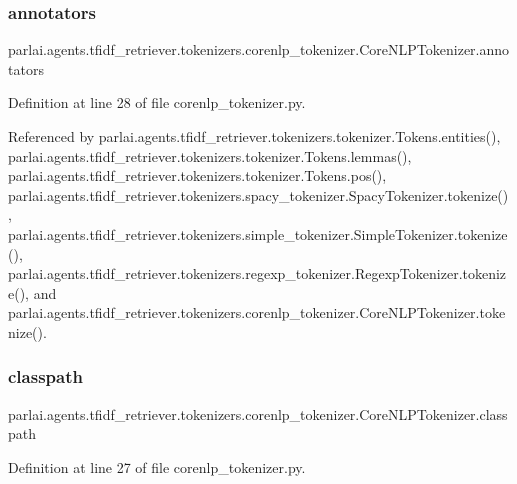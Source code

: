 \subsubsection{\texorpdfstring{annotators}{annotators}}
{\footnotesize\ttfamily parlai.\+agents.\+tfidf\+\_\+retriever.\+tokenizers.\+corenlp\+\_\+tokenizer.\+Core\+N\+L\+P\+Tokenizer.\+annotators}



Definition at line 28 of file corenlp\+\_\+tokenizer.\+py.



Referenced by parlai.\+agents.\+tfidf\+\_\+retriever.\+tokenizers.\+tokenizer.\+Tokens.\+entities(), parlai.\+agents.\+tfidf\+\_\+retriever.\+tokenizers.\+tokenizer.\+Tokens.\+lemmas(), parlai.\+agents.\+tfidf\+\_\+retriever.\+tokenizers.\+tokenizer.\+Tokens.\+pos(), parlai.\+agents.\+tfidf\+\_\+retriever.\+tokenizers.\+spacy\+\_\+tokenizer.\+Spacy\+Tokenizer.\+tokenize(), parlai.\+agents.\+tfidf\+\_\+retriever.\+tokenizers.\+simple\+\_\+tokenizer.\+Simple\+Tokenizer.\+tokenize(), parlai.\+agents.\+tfidf\+\_\+retriever.\+tokenizers.\+regexp\+\_\+tokenizer.\+Regexp\+Tokenizer.\+tokenize(), and parlai.\+agents.\+tfidf\+\_\+retriever.\+tokenizers.\+corenlp\+\_\+tokenizer.\+Core\+N\+L\+P\+Tokenizer.\+tokenize().

\mbox{\label{classparlai_1_1agents_1_1tfidf__retriever_1_1tokenizers_1_1corenlp__tokenizer_1_1CoreNLPTokenizer_a7364a69ba2dbb4faeeab4565d191f134}} 
\subsubsection{\texorpdfstring{classpath}{classpath}}
{\footnotesize\ttfamily parlai.\+agents.\+tfidf\+\_\+retriever.\+tokenizers.\+corenlp\+\_\+tokenizer.\+Core\+N\+L\+P\+Tokenizer.\+classpath}



Definition at line 27 of file corenlp\+\_\+tokenizer.\+py.

